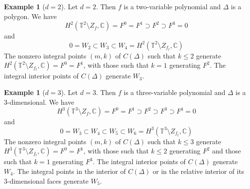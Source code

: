 \documentclass[11pt, reqno]{amsart}
\theoremstyle{plain}
\theoremstyle{definition}
\newtheorem{example}[thm]{Example}
\newcommand{\CC}{\mathbb{C}}
\newcommand{\TT}{\mathbb{T}}
\begin{document}
\smallskip


\begin{example}[$d=2$]
Let $d=2$. Then $f$ is a two-variable polynomial and $\Delta$ is a polygon.  We have
\[  H^2(\TT^2\setminus Z_{f}, \CC)=F^0=F^1 \supset F^2 \supset F^3=0
\]
and 
\[
0=W_2 \subset W_3 \subset W_4=H^2(\TT^2\setminus Z_{f_t}, \CC)\]
The nonzero integral points $(m,k)$ of $C(\Delta)$ such that $k \leq 2$ generate $H^2(\TT^2\setminus Z_{f_t}, \CC)=F^0=F^1$, with those such that $k=1$ generating $F^2$. 
The integral interior points of $C(\Delta)$ generate $W_3$. 
\end{example}


\begin{example}[$d=3$]
   Let $d=3$. Then $f$ is a three-variable polynomial and $\Delta$ is a $3$-dimensional.  We have
\[  H^3(\TT^3\setminus Z_{f}, \CC)=F^0=F^1 \supset F^2 \supset F^3 \supset F^4=0
\]
and 
\[
0=W_3 \subset W_4 \subset W_5 \subset W_6=H^3(\TT^3\setminus Z_{f_t}, \CC)\]
The nonzero integral points $(m,k)$ of $C(\Delta)$ such that $k \leq 3$ generate $H^3(\TT^3\setminus Z_{f_t}, \CC)=F^0=F^1$, with those such that $k\leq2$ generating $F^2$ and those such that $k=1$ generating $F^3$. 
The integral interior points of $C(\Delta)$ generate $W_4$. The integral points in the interior of $C(\Delta)$ or in the relative interior of its $3$-dimensional faces generate $W_5$. 
\end{example}
\end{document}
